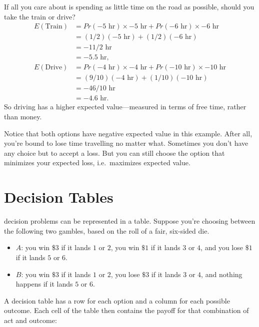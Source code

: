 \documentclass[justified]{tufte-book}
\providecommand{\tightlist}{%
  \setlength{\itemsep}{0pt}\setlength{\parskip}{0pt}}
\newcommand{\p}{Pr}
\newcommand{\E}{E}
\theoremstyle{definition}
\theoremstyle{definition}
\theoremstyle{definition}
\theoremstyle{remark}
\begin{document}
If all you care about is spending as little time on the road as
possible, should you take the train or drive? \[
  \begin{aligned}
    \E(\mbox{Train}) &= \p(-5{\mbox{ hr}}) \times -5{\mbox{ hr}}+ \p(-6{\mbox{ hr}}) \times -6{\mbox{ hr}}\\
                     &= (1/2)(-5{\mbox{ hr}}) + (1/2)(-6{\mbox{ hr}})\\
                     &= -11/2{\mbox{ hr}}\\
                     &= -5.5{\mbox{ hr}},\\
    \E(\mbox{Drive}) &= \p(-4{\mbox{ hr}}) \times -4{\mbox{ hr}}+ \p(-10{\mbox{ hr}}) \times -10{\mbox{ hr}}\\
                     &= (9/10)(-4{\mbox{ hr}}) + (1/10)(-10{\mbox{ hr}})\\
                     &= -46/10{\mbox{ hr}}\\
                     &= -4.6{\mbox{ hr}}.
  \end{aligned}
\] So driving has a higher expected value---measured in terms of free
time, rather than money.

Notice that both options have negative expected value in this example.
After all, you're bound to lose time travelling no matter what.
Sometimes you don't have any choice but to accept a loss. But you can
still choose the option that minimizes your expected loss,
i.e.~maximizes expected value.

\hypertarget{decision-tables}{%
\section{Decision Tables}\label{decision-tables}}

 decision problems can be represented in a table.
Suppose you're choosing between the following two gambles, based on the
roll of a fair, six-sided die.

\begin{itemize}
\tightlist
\item
  \(A\): you win \$3 if it lands \(1\) or \(2\), you win \(\$1\) if it
  lands \(3\) or \(4\), and you lose \(\$1\) if it lands \(5\) or \(6\).
\item
  \(B\): you win \(\$3\) if it lands \(1\) or \(2\), you lose \(\$3\) if
  it lands \(3\) or \(4\), and nothing happens if it lands \(5\) or
  \(6\).
\end{itemize}

A decision table has a row for each option and a column for each
possible outcome. Each cell of the table then contains the payoff for
that combination of act and outcome:
\end{document}
